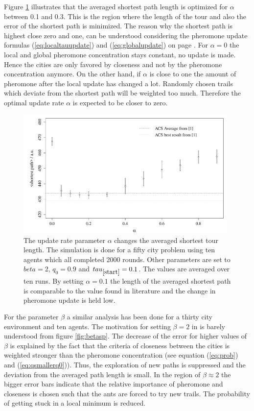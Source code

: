 Figure \ref{fig:alphasp} illustrates that the averaged shortest path length is optimized for $\alpha$ between 0.1 and 0.3. This is the region where the length of the tour and also the error of the shortest path is minimized. The reason why the shortest path is highest close zero and one, can be understood considering the pheromone update formulas (\ref{eq:localtauupdate}) and (\ref{eq:globalupdate}) on page \pageref{sec:model}. For $\alpha=0$ the local and global pheromone concentration stays constant, no update is made. Hence the cities are only favored by closeness and not by the pheromone concentration anymore. On the other hand, if $\alpha$ is close to one the amount of pheromone after the local update has changed a lot. Randomly chosen trails which deviate from the shortest path will be weighted too much. Therefore the optimal update rate $\alpha$ is expected to be closer to zero. 

\begin{figure}[h!]
\begin{center}
\includegraphics[width=11cm, height= 6 cm]{alpha_vs_shortestpath}
\caption{The update rate parameter $\alpha$ changes the averaged shortest tour length. The simulation is done for a fifty city problem using ten agents which all completed 2000 rounds. Other parameters are set to $beta=2$, $q_0=0.9$ and $tau_{\ref{start}}=0.1$. The values are averaged over ten runs. By setting $\alpha=0.1$ the length of the averaged shortest path is comparable to the value found in literature \cite{paper} and the change in pheromone update is held low.}
\label{fig:alphasp}
\end{center}
\end{figure}

For the parameter $\beta$ a similar analysis has been done for a thirty city environment and ten agents. The motivation for setting $\beta=2$ in \cite{paper} is barely understood from figure \ref{fig:betasp}. The decrease of the error for higher values of $\beta$ is explained by the fact that the criteria of closeness between the cities is weighted stronger than the pheromone concentration (see equation (\ref{eq:prob}) and (\ref{eq:qsmallerq0})). Thus, the exploration of new paths is suppressed and the deviation from the averaged path length is small. In the region of $\beta\approx2$ the bigger error bars indicate that the relative importance of pheromone and closeness is chosen such that the ants are forced to try new trails. The probability of getting stuck in a local minimum is reduced.

